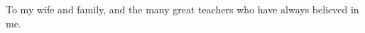 \documentclass[final, numrefs]{nddiss2e}
\begin{document}

\renewcommand{\dedicationname}{DEDICATION} %
\begin{dedication}
To my wife and family, and the many great teachers who have always believed in me.
\end{dedication}

\tableofcontents
\listoffigures
\listoftables


\end{document}

